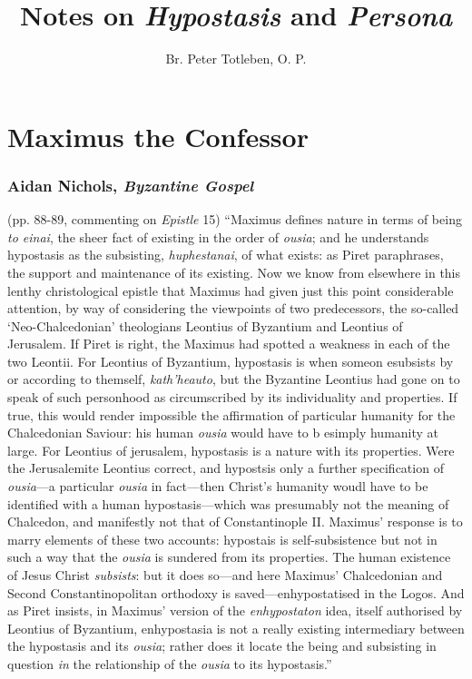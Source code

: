 \documentclass{classpaper}
\title{Notes on \emph{Hypostasis} and \emph{Persona}}
\author{Br. Peter Totleben, O. P.}
\date{}
\begin{document}
\section{Maximus the Confessor}

\subsubsection{Aidan Nichols, \emph{Byzantine Gospel}}

(pp. 88-89, commenting on \emph{Epistle} 15) ``Maximus defines nature in terms of being \emph{to einai}, the sheer fact
of existing in the order of \emph{ousia}; and he understands hypostasis as the subsisting, \emph{huphestanai}, of what
exists: as Piret paraphrases, the support and maintenance of its existing. Now we know from elsewhere in this lenthy
christological epistle that Maximus had given just this point considerable attention, by way of considering the
viewpoints of two predecessors, the so-called `Neo-Chalcedonian' theologians Leontius of Byzantium and Leontius of
Jerusalem. If Piret is right, the Maximus had spotted a weakness in each of the two Leontii. For Leontius of Byzantium,
hypostasis is when someon esubsists by or according to themself, \emph{kath'heauto}, but the Byzantine Leontius had gone
on to speak of such personhood as circumscribed by its individuality and properties. If true, this would render
impossible the affirmation of particular humanity for the Chalcedonian Saviour: his human \emph{ousia} would have to b
esimply humanity at large. For Leontius of jerusalem, hypostasis is a nature with its properties. Were the Jerusalemite
Leontius correct, and hypostsis only a further specification of \emph{ousia}---a particular \emph{ousia} in fact---then
Christ's humanity woudl have to be identified with a human hypostasis---which was presumably not the meaning of
Chalcedon, and manifestly not that of Constantinople II. Maximus' response is to marry elements of these two accounts:
hypostais is self-subsistence but not in such a way that the \emph{ousia} is sundered from its properties. The human
existence of Jesus Christ \emph{subsists}: but it does so---and here Maximus' Chalcedonian and 
Second Constantinopolitan orthodoxy is saved---enhypostatised in the Logos. And as Piret insists, in Maximus' version of
the \emph{enhypostaton} idea, itself authorised by Leontius of Byzantium, enhypostasia is not a really existing
intermediary between the hypostasis and its \emph{ousia}; rather does it locate the being and subsisting in question
\emph{in} the relationship of the \emph{ousia} to its hypostasis.''
\end{document}

